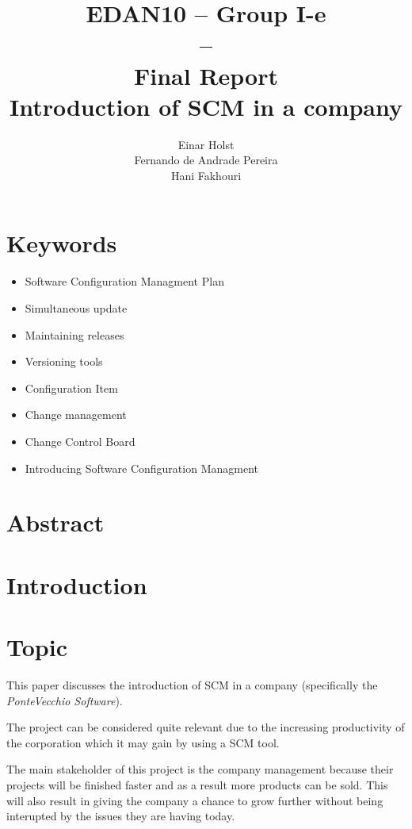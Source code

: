 \documentclass[a4paper]{article}
\title{EDAN10 -- Group I-e\\--\\ Final Report \\
Introduction of SCM in a company 
}
\author{Einar Holst \\
Fernando de Andrade Pereira \\
Hani Fakhouri
}
\begin{document}
\maketitle
\thispagestyle{empty}
\clearpage

\tableofcontents
\thispagestyle{empty}
\clearpage

\setcounter{page}{1}

\section{Keywords}
\begin{itemize}
\item Software Configuration Managment Plan
\item Simultaneous update
\item Maintaining releases
\item Versioning tools
\item Configuration Item
\item Change management
\item Change Control Board
\item Introducing Software Configuration Managment
\end{itemize}

\section{Abstract}

\section{Introduction}


\section{Topic}
This paper discusses the introduction of SCM in a company (specifically the \emph{PonteVecchio Software}).

The project can be considered quite relevant due to the increasing productivity of the corporation which it may gain by using a SCM tool.

The main stakeholder of this project is the company management because their projects will be finished faster and as a result more products can be sold. This will also result in giving the company a chance to grow further without being interupted by the issues they are having today.
\end{document}
